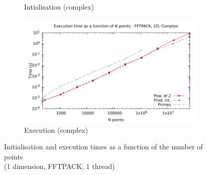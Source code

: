 \documentclass[12pt, a4paper]{article}
\begin{document}
\begin{figure}[H]
\begin{subfigure}{.5\textwidth}
\caption{Intialisation (complex)}
\label{1DFFTPACKCI}
\end{subfigure}%
\begin{subfigure}{.5\textwidth}
\centering
\includegraphics[width=.9\linewidth]{graphs/1d-fftpack-exec-c.pdf}
\caption{Execution (complex)}
\label{1DFFTPACKC}
\end{subfigure}
\caption{Initialisation and execution times as a function of the number of points\\(1 dimension, FFTPACK, 1 thread)}
\label{1DFFTPACK}
\end{figure}
\end{document}
